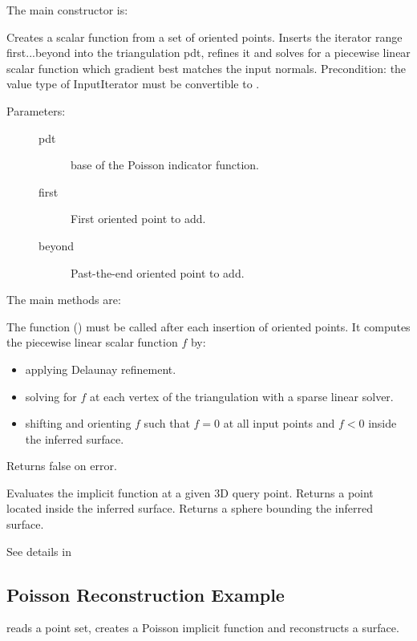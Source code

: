 The main constructor is:

{
Creates a scalar function from a set of oriented points. Inserts the iterator range first...beyond into the triangulation pdt, refines it and solves for a piecewise linear scalar function which gradient best matches the input normals.
Precondition: the value type of InputIterator must be convertible to .
}
\ccGlue
\begin{description}
\item[Parameters:]
\begin{description}
\item[pdt] base of the Poisson indicator function.
\item[first] First oriented point to add.
\item[beyond] Past-the-end oriented point to add. \end{description}
\end{description}

The main methods are:

{
The function () must be called after each insertion of oriented points. It computes the piecewise linear scalar function $f$ by:
\begin{itemize}
\item applying Delaunay refinement.
\item solving for $f$ at each vertex of the triangulation with a sparse linear solver. 
\item shifting and orienting $f$ such that $f=0$ at all input points and $f<0$ inside the inferred surface.
\end{itemize}
Returns false on error.
}
\ccGlue
{}
{
Evaluates the implicit function at a given 3D query point.
}
\ccGlue
{}
{
Returns a point located inside the inferred surface.
}
{
Returns a sphere bounding the inferred surface.
}

See details in \\


\subsection{Poisson Reconstruction Example}

 reads a point set, creates a Poisson implicit function and reconstructs a surface.




